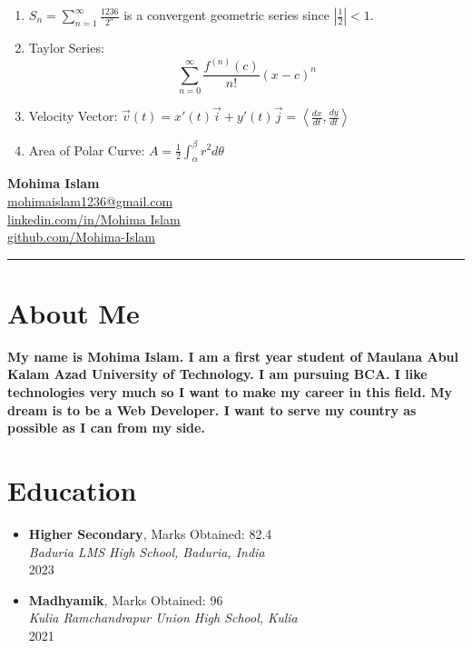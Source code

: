 \documentclass[12pt]{article}
\begin{document}
\begin{enumerate}
    \item $S_n = \sum_{n=1}^{\infty} \frac{1236}{2^n}$ is a convergent geometric series since $\left|\frac{1}{2}\right| < 1$.
    
    \item Taylor Series:
    \[
    \sum_{n=0}^{\infty} \frac{f^{(n)}(c)}{n!} (x - c)^n
    \]
    
    \item Velocity Vector: $\vec{v}(t) = x'(t)\vec{i} + y'(t)\vec{j} = \left\langle \frac{dx}{dt}, \frac{dy}{dt} \right\rangle$
    
    \item Area of Polar Curve: $A = \frac{1}{2} \int_{\alpha}^{\beta} r^2 d\theta$
\end{enumerate}
\newpage
\begin{center}
    {\LARGE \textbf{Mohima Islam}} \\
    \vspace{2mm}
    \href{mailto:mohimaislam1236@gmail.com}{mohimaislam1236@gmail.com} \\
    \href{https://www.linkedin.com/in/Mohima Islam}{linkedin.com/in/Mohima Islam} \\
    \href{https://github.com/Mohima-Islam}{github.com/Mohima-Islam} \\
    \vspace{2mm}
    \hrule
\end{center}
\section*{About Me}
\textbf{My name is Mohima Islam. I am a first year student of Maulana Abul Kalam Azad University of Technology. I am pursuing BCA. I like technologies very much so I want to make my career in this field. My dream is to be a Web Developer. I want to serve my country as possible as I can from my side. }
\section*{Education}
\begin{itemize}[leftmargin=0.5cm]
    \item \textbf{Higher Secondary}, Marks Obtained: 82.4 \\
    \textit{Baduria LMS High School, Baduria, India} \\
    2023
    \item \textbf{Madhyamik}, Marks Obtained: 96\\
    \textit{Kulia Ramchandrapur Union High School, Kulia}\\
    2021
\end{itemize}
\end{document}
